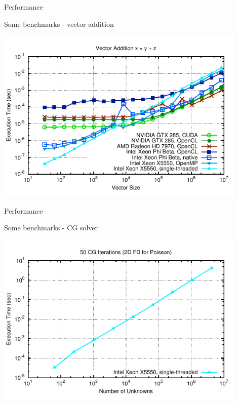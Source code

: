 \begin{frame}{Performance}
\begin{block}{Some benchmarks - vector addition}
  \begin{center}
   \includegraphics[width=0.9\textwidth]{figs/vector-timings-7}
  \end{center}
\end{block}
\end{frame}



\begin{frame}{Performance}
\begin{block}{Some benchmarks - CG solver}
  \begin{center}
   \includegraphics[width=0.9\textwidth]{figs/cg-timings-1}
  \end{center}
\end{block}
\end{frame}

